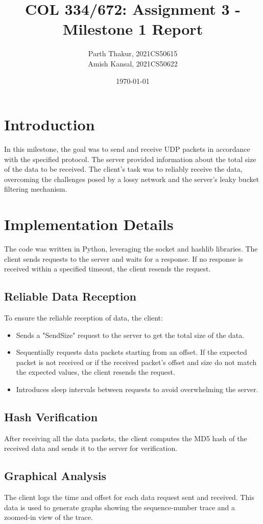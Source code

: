 \documentclass[12pt, a4paper]{article}
\title{COL 334/672: Assignment 3 - Milestone 1 Report}
\author{Parth Thakur, 2021CS50615 \\ Amish Kansal, 2021CS50622}
\date{\today}
\begin{document}
\maketitle

\section{Introduction}
In this milestone, the goal was to send and receive UDP packets in accordance with the specified protocol. The server provided information about the total size of the data to be received. The client's task was to reliably receive the data, overcoming the challenges posed by a lossy network and the server's leaky bucket filtering mechanism.

\section{Implementation Details}
The code was written in Python, leveraging the socket and hashlib libraries. The client sends requests to the server and waits for a response. If no response is received within a specified timeout, the client resends the request.

\subsection{Reliable Data Reception}
To ensure the reliable reception of data, the client:
\begin{itemize}
    \item Sends a "SendSize" request to the server to get the total size of the data.
    \item Sequentially requests data packets starting from an offset. If the expected packet is not received or if the received packet's offset and size do not match the expected values, the client resends the request.
    \item Introduces sleep intervals between requests to avoid overwhelming the server.
\end{itemize}

\subsection{Hash Verification}
After receiving all the data packets, the client computes the MD5 hash of the received data and sends it to the server for verification.

\subsection{Graphical Analysis}
The client logs the time and offset for each data request sent and received. This data is used to generate graphs showing the sequence-number trace and a zoomed-in view of the trace.
\end{document}
